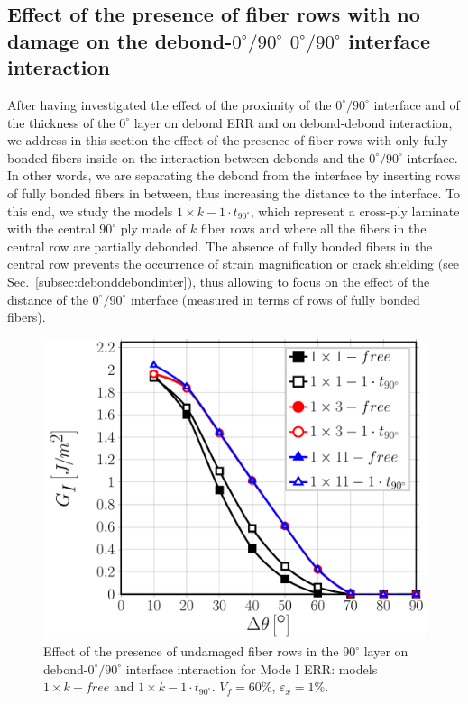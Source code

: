 \documentclass[review]{elsarticle}
\begin{document}
\subsection{Effect of the presence of fiber rows with no damage on the debond-$0^{\circ}/90^{\circ}$ $0^{\circ}/90^{\circ}$ interface interaction}

After having investigated the effect of the proximity of the $0^{\circ}/90^{\circ}$ interface and of the thickness of the $0^{\circ}$ layer on debond ERR and on debond-debond interaction, we address in this section the effect of the presence of fiber rows with only fully bonded fibers inside on the interaction between debonds and the $0^{\circ}/90^{\circ}$ interface. In other words, we are separating the debond from the interface by inserting rows of fully bonded fibers in between, thus increasing the distance to the interface. To this end, we study the models $1\times k-1\cdot t_{90^{\circ}}$, which represent a cross-ply laminate with the central $90^{\circ}$ ply made of $k$ fiber rows and where all the fibers in the central row are partially debonded. The absence of fully bonded fibers in the central row prevents the occurrence of strain magnification or crack shielding (see Sec.~\ref{subsec:debonddebondinter}), thus allowing to focus on the effect of the distance of the $0^{\circ}/90^{\circ}$ interface (measured in terms of rows of fully bonded fibers).

\begin{figure}[!h]
\centering
\includegraphics[width=\textwidth]{1xk-1-vf60-GI.pdf}
\caption{Effect of the presence of undamaged fiber rows in the $90^{\circ}$ layer on debond-$0^{\circ}/90^{\circ}$ interface interaction for Mode I ERR: models $1\times k-free$ and $1\times k-1\cdot t_{90^{\circ}}$. $V_{f}=60\%$, $\varepsilon_{x}=1\%$.}\label{fig:1kGI}
\end{figure}
\end{document}
